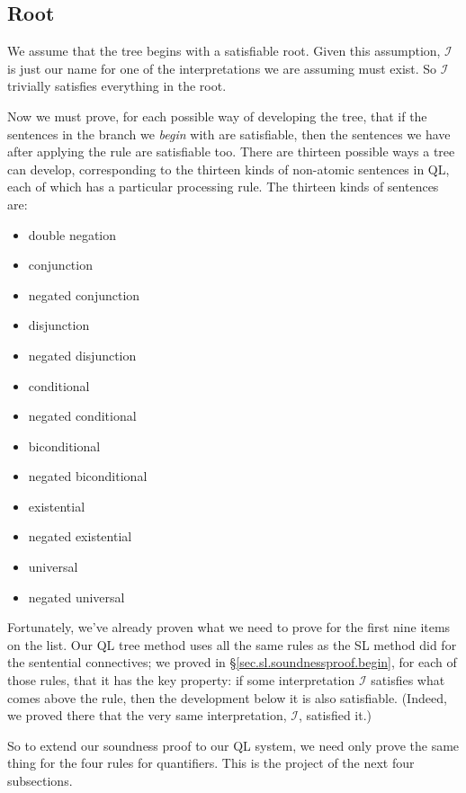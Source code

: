 \subsection{Root}

We assume that the tree begins with a satisfiable root. Given this assumption, $\mathcal{I}$ is just our name for one of the interpretations we are assuming must exist. So $\mathcal{I}$ trivially satisfies everything in the root.

Now we must prove, for each possible way of developing the tree, that if the sentences in the branch we \emph{begin} with are satisfiable, then the sentences we have after applying the rule are satisfiable too. There are thirteen possible ways a tree can develop, corresponding to the thirteen kinds of non-atomic sentences in QL, each of which has a particular processing rule. The thirteen kinds of sentences are:

\begin{itemize}
\item double negation
\item conjunction
\item negated conjunction
\item disjunction
\item negated disjunction
\item conditional
\item negated conditional
\item biconditional
\item negated biconditional
\item existential
\item negated existential
\item universal
\item negated universal
\end{itemize}

Fortunately, we've already proven what we need to prove for the first nine items on the list. Our QL tree method uses all the same rules as the SL method did for the sentential connectives; we proved in \S\ref{sec.sl.soundnessproof.begin}, for each of those rules, that it has the key property: if some interpretation $\mathcal{I}$ satisfies what comes above the rule, then the development below it is also satisfiable. (Indeed, we proved there that the very same interpretation, $\mathcal{I}$, satisfied it.)

So to extend our soundness proof to our QL system, we need only prove the same thing for the four rules for quantifiers. This is the project of the next four subsections.

